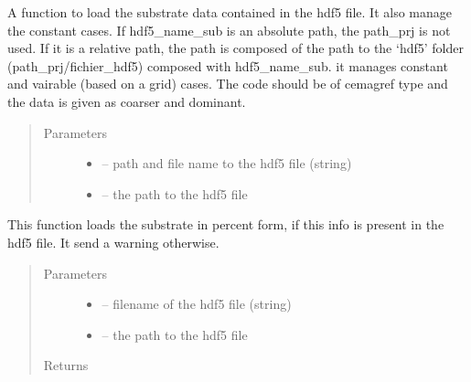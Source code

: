 \documentclass[letterpaper,10pt,english]{sphinxmanual}
\begin{document}
\begin{fulllineitems}
\label{\detokenize{index:src.load_hdf5.load_hdf5_sub}}
A function to load the substrate data contained in the hdf5 file. It also manage
the constant cases. If hdf5\_name\_sub is an absolute path, the path\_prj is not used. If it is a relative path,
the path is composed of the path to the `hdf5' folder (path\_prj/fichier\_hdf5) composed with hdf5\_name\_sub. it manages constant and
vairable (based on a grid) cases. The code should be of cemagref type and the data is given as coarser and dominant.
\begin{quote}\begin{description}
\item[{Parameters}] \leavevmode\begin{itemize}
\item {} 
 -- path and file name to the hdf5 file (string)

\item {} 
 -- the path to the hdf5 file

\end{itemize}

\end{description}\end{quote}

\end{fulllineitems}


\begin{fulllineitems}
\label{\detokenize{index:src.load_hdf5.load_sub_percent}}
This function loads the substrate in percent form, if this info is present in the hdf5 file. It send a warning
otherwise.
\begin{quote}\begin{description}
\item[{Parameters}] \leavevmode\begin{itemize}
\item {} 
 -- filename of the hdf5 file (string)

\item {} 
 -- the path to the hdf5 file

\end{itemize}

\item[{Returns}] \leavevmode


\end{description}\end{quote}

\end{fulllineitems}
\end{document}
